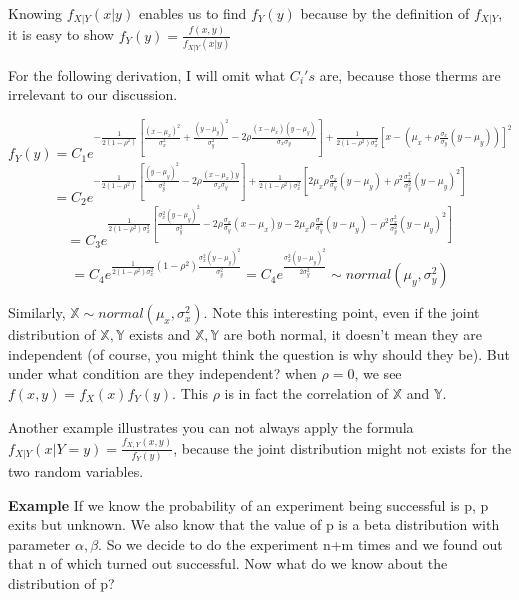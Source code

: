 \documentclass[a4paper,12pt]{article}
\begin{document}
Knowing $f_{X|Y}(x|y)$ enables us to find $f_Y(y)$ because by the definition of $f_{X|Y}$, it is easy to show $f_Y(y) = \frac{f(x, y)}{f_{X|Y}(x|y)} $ 

For the following derivation, I will omit what $C_i's$ are, because those therms are irrelevant to our discussion.

$$f_Y(y) = C_1 e^{ -\frac{1}{2(1-\rho^2)} [\frac{(x-\mu_x)^2}{\sigma^2_x} + \frac{(y-\mu_y)^2}{\sigma^2_y} - 2\rho\frac{(x-\mu_x)(y-\mu_y)}{\sigma_x\sigma_y}] + \frac{1}{2(1-\rho^2)\sigma^2_x} [x-(\mu_x + \rho\frac{\sigma_x}{\sigma_y}(y-\mu_y))]^2}$$
$$= C_2 e^{ -\frac{1}{2(1-\rho^2)} [ \frac{(y-\mu_y)^2}{\sigma^2_y} - 2\rho\frac{(x-\mu_x)y}{\sigma_x\sigma_y}] + \frac{1}{2(1-\rho^2)\sigma^2_x} [2\mu_x\rho\frac{\sigma_x}{\sigma_y}(y-\mu_y) + \rho^2\frac{\sigma^2_x}{\sigma^2_y}(y-\mu_y)^2]}$$
$$= C_3 e^{ \frac{1}{2(1-\rho^2)\sigma^2_x} [ \frac{\sigma^2_x(y-\mu_y)^2}{\sigma^2_y} - 2\rho\frac{\sigma_x}{\sigma_y}(x-\mu_x)y - 2\mu_x\rho\frac{\sigma_x}{\sigma_y}(y-\mu_y) - \rho^2\frac{\sigma^2_x}{\sigma^2_y}(y-\mu_y)^2]  }$$
$$= C_4 e^{ \frac{1}{2(1-\rho^2)\sigma^2_x}  (1-\rho^2) \frac{\sigma^2_x(y-\mu_y)^2}{\sigma^2_y}} = C_4 e^{ \frac{\sigma^2_x(y-\mu_y)^2}{2\sigma^2_y}} \sim normal( \mu_y, \sigma^2_y )$$

Similarly, $\mathbb{X} \sim  normal( \mu_x, \sigma^2_x)$. Note this interesting point, even if the joint distribution of $\mathbb{X}, \mathbb{Y}$ exists and $\mathbb{X}, \mathbb{Y}$ are both normal, it doesn't mean they are independent (of course, you might think the question is why should they be). But under what condition are they independent? when $\rho = 0$, we see $f(x, y) = f_X(x)f_Y(y)$. This $\rho$ is in fact the correlation of $\mathbb{X}$ and $\mathbb{Y}$. 

Another example illustrates you can not always apply the formula $f_{X|Y}(x|Y=y) = \frac{f_{X,Y}(x, y)}{f_Y(y)}$, because the joint distribution might not exists for the two random variables. 

\textbf{Example} If we know the probability of an experiment being successful is p, p exits but unknown. We also know that the value of p is a beta distribution with parameter $\alpha, \beta$. So we decide to do the experiment n+m times and we found out that n of which turned out successful. Now what do we know about the distribution of p? 
\end{document}
